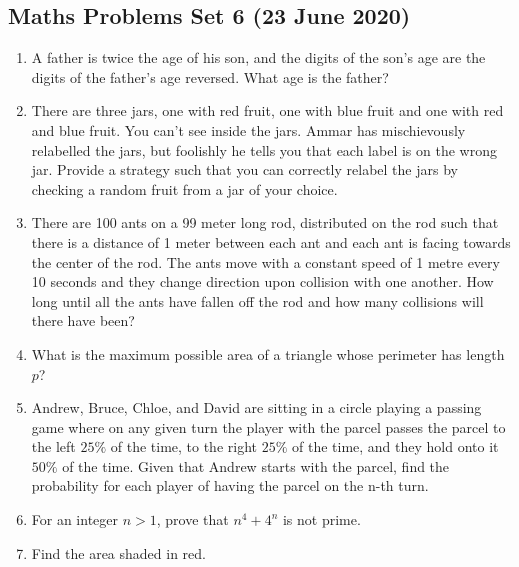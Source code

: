 \documentclass{article}
\begin{document}
\begin{center}
        \section*{Maths Problems Set 6 (23 June 2020)}
\end{center}

\begin{enumerate}

    \item %
    A father is twice the age of his son, and the digits of the son's age are the digits of the father's age reversed. What age is the father?
    
    
    \item
    There are three jars, one with red fruit, one with blue fruit and one with red and blue fruit. You can’t see inside the jars. Ammar has mischievously relabelled the jars, but foolishly he tells you that each label is on the wrong jar. Provide a strategy such that you can correctly relabel the jars by checking a random fruit from a jar of your choice.
    
    \item
    There are 100 ants on a 99 meter long rod, distributed on the rod such that there is a distance of 1 meter between each ant and each ant is facing towards the center of the rod. The ants move with a constant speed of 1 metre every 10 seconds and they change direction upon collision with one another. How long until all the ants have fallen off the rod and how many collisions will there have been?
    
    \item
    What is the maximum possible area of a triangle whose perimeter has length $p$?
    
    \item
    Andrew, Bruce, Chloe, and David are sitting in a circle playing a passing game where on any given turn the player with the parcel passes the parcel to the left $25\%$ of the time, to the right $25\%$ of the time, and they hold onto it $50\%$ of the time. Given that Andrew starts with the parcel, find the probability for each player of having the parcel on the n-th turn.
    
    \item
    For an integer $n > 1$, prove that $n^4 + 4^n$ is not prime.
    
    \item Find the area shaded in red.\\ %
    \\
\end{enumerate}
\end{document}

